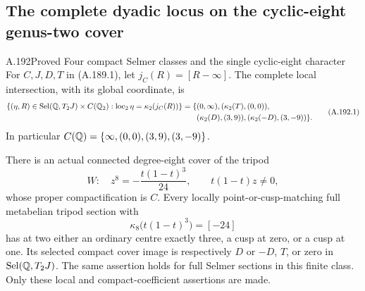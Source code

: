 \subsection{The complete dyadic locus on the cyclic-eight genus-two cover}

\begin{statement}{A.192}{Proved}
{Four compact Selmer classes and the single cyclic-eight character}
For \(C,J,D,T\) in (A.189.1), let
\(j_C(R)=[R-\infty]\).  The complete local intersection,
with its global coordinate, is
\[
\begin{aligned}
 \{(\eta,R)\in\operatorname{Sel}(\mathbb Q,T_2J)\times C(\mathbb Q_2):
       \operatorname{loc}_2\eta=\kappa_2(j_C(R))\}
  =\{&(0,\infty),(\kappa_2(T),(0,0)),\\
     &(\kappa_2(D),(3,9)),(\kappa_2(-D),(3,-9))\}.
\end{aligned}
\tag{A.192.1}
\]
In particular
\(C(\mathbb Q)=\{\infty,(0,0),(3,9),(3,-9)\}\).

There is an actual connected degree-eight cover of the tripod
\[
 W:\quad z^8=-\frac{t(1-t)^3}{24},\qquad t(1-t)z\ne0,
\tag{A.192.2}
\]
whose proper compactification is \(C\).  Every locally
point-or-cusp-matching full metabelian tripod section with
\[
                   \kappa_8\bigl(t(1-t)^3\bigr)=[-24]
\tag{A.192.3}
\]
has at two either an ordinary centre exactly three, a cusp
at zero, or a cusp at one.  Its selected compact cover
image is respectively \(D\) or \(-D\), \(T\), or zero
in \(\operatorname{Sel}(\mathbb Q,T_2J)\).  The same assertion
holds for full Selmer sections in this finite class.
Only these local and compact-coefficient assertions are made.
\end{statement}

